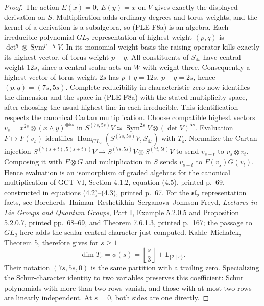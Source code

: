 \begin{proof}
The action $E(x)=0$, $E(y)=x$ on $V$ gives exactly the displayed
derivation on $S$. Multiplication adds ordinary degrees and torus
weights, and the kernel of a derivation is a subalgebra, so (PLE-F8a)
is an algebra. Each irreducible polynomial $GL_2$ representation of
highest weight $(p,q)$ is $\det^q\otimes\operatorname{Sym}^{p-q}V$.
In its monomial weight basis the raising operator kills exactly its
highest vector, of torus weight $p-q$. All constituents of $S_{4s}$
have central weight $12s$, since a central scalar acts on $W$ with
weight three. Consequently a highest vector of torus weight $2s$
has $p+q=12s$, $p-q=2s$, hence $(p,q)=(7s,5s)$.
Complete reducibility in characteristic zero now identifies the
dimension and the space in (PLE-F8a) with the stated multiplicity
space, after choosing the usual highest line in each irreducible.
This identification respects the canonical Cartan multiplication.
Choose compatible highest vectors
$v_s=x^{2s}\otimes(x\wedge y)^{\otimes5s}$ in
$S^{(7s,5s)}V\simeq\operatorname{Sym}^{2s}V\otimes(\det V)^{5s}$.
Evaluation $F\mapsto F(v_s)$ identifies
$\operatorname{Hom}_{GL_2}(S^{(7s,5s)}V,S_{4s})$ with $T_s$.
Normalize the Cartan injection
$S^{(7(s+t),5(s+t))}V\to
 S^{(7s,5s)}V\otimes S^{(7t,5t)}V$
to send $v_{s+t}$ to $v_s\otimes v_t$.
Composing it with $F\otimes G$ and multiplication in $S$ sends
$v_{s+t}$ to $F(v_s)G(v_t)$. Hence evaluation is an isomorphism
of graded algebras for the canonical multiplication of GCT VI,
Section 4.1.2, equation (4.5), printed p.~69, constructed in
equations (4.2)--(4.3), printed p.~67.
For the $\mathfrak{sl}_2$ representation facts, see
Borcherds--Haiman--Reshetikhin--Serganova--Johnson-Freyd,
\emph{Lectures in Lie Groups and Quantum Groups}, Part I,
Example 5.2.0.5 and Proposition 5.2.0.7, printed pp.~68--69,
and Theorem 7.6.1.3, printed p.~167; the passage to $GL_2$ here
adds the scalar central character just computed.
Kahle--Micha\l ek, Theorem 5, therefore gives for $s\ge1$
\[
 \dim T_s=\phi(s)=\left\lfloor\frac{s}{3}\right\rfloor
                      +\mathbf1_{\{2\mid s\}}.
 \tag{PLE-F8d}
\]
Their notation $(7s,5s,0)$ is the same partition with a trailing
zero. Specializing the Schur-character identity to two variables
preserves this coefficient: Schur polynomials with more than two
rows vanish, and those with at most two rows are linearly independent.
At $s=0$, both sides are one directly.


\end{proof}

